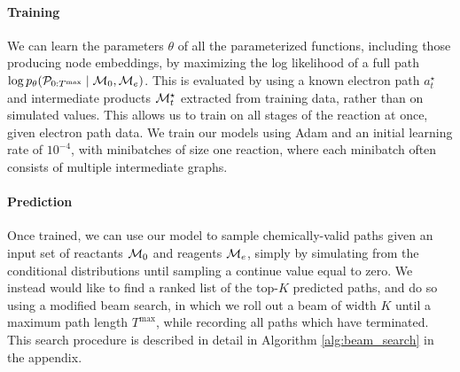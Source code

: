 \paragraph{Training}
We can learn the parameters $\theta$ of all the parameterized functions, including those producing node embeddings, by maximizing the log likelihood of a full path $\log p_\theta({\mathcal{P}}_{0:T^{\mathrm{max}}} \mid {\mathcal{M}}_0, {\mathcal{M}}_e)$.
This is evaluated by using a known electron path $a_t^\star$ and intermediate products ${\mathcal{M}}_t^\star$ extracted from training data,
rather than on simulated values. 
This allows us to train on all stages of the reaction at once, given electron path data.
We train our models using Adam \citep{kingma2014adam} and an initial learning rate of $10^{-4}$,
with minibatches of size one reaction, where each minibatch often consists of multiple intermediate graphs.

\paragraph{Prediction}
Once trained, we can use our model to sample chemically-valid paths given an input set of reactants ${\mathcal{M}}_0$ and reagents ${\mathcal{M}}_e$, 
simply by simulating from the conditional distributions until sampling a continue value equal to zero.
We instead would like to find a ranked list of the top-$K$ predicted paths, and do so using a modified beam search,
in which we roll out a beam of width $K$ until a maximum path length $T^\mathrm{max}$,
while recording all paths which have terminated.
This search procedure is described in detail in Algorithm \ref{alg:beam_search} in the appendix.



